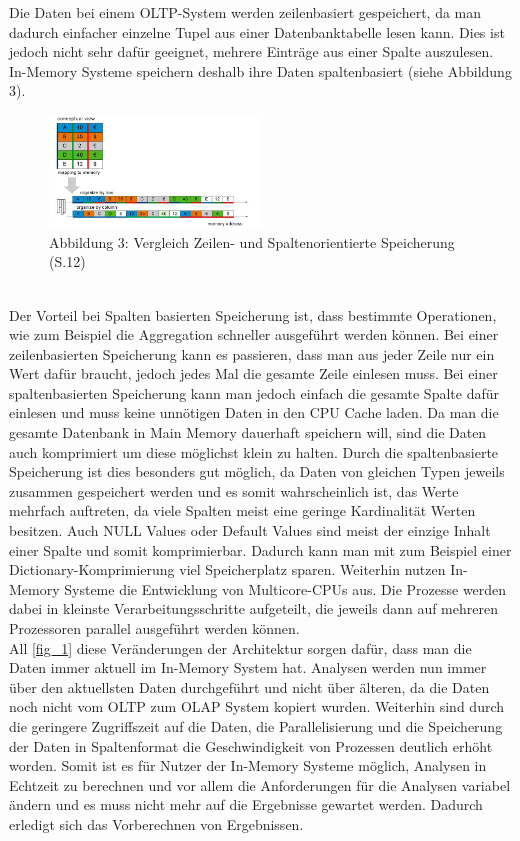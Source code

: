 Die Daten bei einem OLTP-System werden zeilenbasiert gespeichert, da man dadurch einfacher einzelne Tupel aus einer Datenbanktabelle lesen kann. Dies ist jedoch nicht sehr dafür geeignet, mehrere Einträge aus einer Spalte auszulesen.
In-Memory Systeme speichern deshalb ihre Daten spaltenbasiert (siehe Abbildung 3).
\begin{figure}[ht]
  \begin{center}
  \includegraphics[width=0.5\textwidth]{images/mappingtomemory.png}
  \end{center}
  \caption{Abbildung 3: Vergleich Zeilen- und Spaltenorientierte Speicherung (\cite{sap}S.12)}
  \label{fig_3}
\end{figure} 
\\
Der Vorteil bei Spalten basierten Speicherung ist, dass bestimmte Operationen, wie zum Beispiel die Aggregation schneller ausgeführt werden können. Bei einer zeilenbasierten Speicherung kann es passieren, dass man aus jeder Zeile nur ein Wert dafür braucht, jedoch jedes Mal die gesamte Zeile einlesen muss. Bei einer spaltenbasierten Speicherung kann man jedoch einfach die gesamte Spalte dafür einlesen und muss keine unnötigen Daten in den CPU Cache laden.
Da man die gesamte Datenbank in Main Memory dauerhaft speichern will, sind die Daten auch komprimiert um diese möglichst klein zu halten.
Durch die spaltenbasierte Speicherung ist dies besonders gut möglich, da Daten von gleichen Typen jeweils zusammen gespeichert werden und es somit wahrscheinlich ist, das Werte mehrfach auftreten, da viele Spalten meist eine geringe Kardinalität Werten besitzen. Auch NULL Values oder Default Values sind meist der einzige Inhalt einer Spalte und somit komprimierbar. Dadurch kann man mit zum Beispiel einer Dictionary-Komprimierung viel Speicherplatz sparen.
Weiterhin nutzen In-Memory Systeme die Entwicklung von Multicore-CPUs aus. Die Prozesse werden dabei in kleinste Verarbeitungsschritte aufgeteilt, die jeweils dann auf mehreren Prozessoren parallel ausgeführt werden können.\\
All \ref{fig_1} diese Veränderungen der Architektur sorgen dafür, dass man die Daten immer 
aktuell im In-Memory System hat. Analysen werden nun immer über 
den aktuellsten Daten durchgeführt und nicht über älteren, da die Daten noch nicht vom OLTP zum OLAP System kopiert wurden. Weiterhin sind durch die geringere Zugriffszeit auf die Daten, die Parallelisierung und die Speicherung der Daten in Spaltenformat die Geschwindigkeit von Prozessen deutlich erhöht worden. Somit ist es für Nutzer der In-Memory Systeme möglich, Analysen in Echtzeit zu berechnen und vor allem die Anforderungen für die Analysen variabel ändern und es muss nicht mehr auf die Ergebnisse gewartet werden. Dadurch erledigt sich das Vorberechnen von Ergebnissen.\cite{neumannsap}
\\
